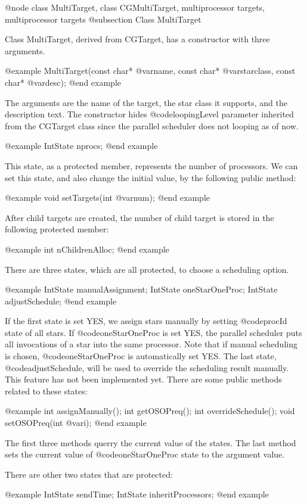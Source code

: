 @node class MultiTarget, class CGMultiTarget, multiprocessor targets, multiprocessor targets
@subsection Class MultiTarget

Class MultiTarget, derived from CGTarget, has a constructor with three
arguments.

@example
MultiTarget(const char* @var{name}, const char* @var{starclass}, const char* @var{desc});
@end example

The arguments are the name of the target, the star class it supports, and the
description text. The constructor hides @code{loopingLevel} parameter
inherited from the CGTarget class since the parallel scheduler does not
looping as of now.

@example
IntState nprocs;
@end example

This state, as a protected member, represents the number of processors.
We can set this state, and also change the initial value, by the following 
public method:

@example
void setTargets(int @var{num});
@end example

After child targets are created, the number of child target is stored in
the following protected member:

@example
int nChildrenAlloc;
@end example

There are three states, which are all protected, to choose a scheduling option.

@example
IntState manualAssignment;
IntState oneStarOneProc;
IntState adjustSchedule;
@end example

If the first state is set YES, we assign stars manually by setting
@code{procId} state of all stars. If @code{oneStarOneProc} is set YES,
the parallel scheduler puts all invocations of a star into the same
processor. Note that if manual scheduling is chosen, @code{oneStarOneProc}
is automatically set YES. The last state, @code{adjustSchedule}, will be
used to override the scheduling result manually. This feature has not been
implemented yet. There are some public methods related to these states:

@example
int assignManually();
int getOSOPreq();
int overrideSchedule();
void setOSOPreq(int @var{i});
@end example

The first three methods querry the current value of the states. The last
method sets the current value of @code{oneStarOneProc} state to the
argument value.

There are other two states that are protected:

@example
IntState sendTime;
IntState inheritProcessors;
@end example

